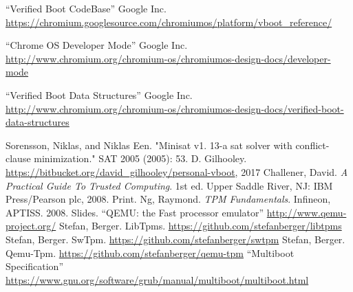 \documentclass[../report.tex]{subfiles}
\begin{document}
\begin{singlespace}
\begin{flushleft}
\begin{footnotesize}
\begin{thebibliography}{\kern\bibindent}
    ``Verified Boot CodeBase'' Google Inc. \url{https://chromium.googlesource.com/chromiumos/platform/vboot_reference/}

    ``Chrome OS Developer Mode'' Google Inc. \url{http://www.chromium.org/chromium-os/chromiumos-design-docs/developer-mode}

    ``Verified Boot Data Structures'' Google Inc. \url{http://www.chromium.org/chromium-os/chromiumos-design-docs/verified-boot-data-structures}

    Sorensson, Niklas, and Niklas Een. "Minisat v1. 13-a sat solver with conflict-clause minimization." SAT 2005 (2005): 53.
    D. Gilhooley. \url{https://bitbucket.org/david\_gilhooley/personal-vboot}, 2017
    Challener, David. \textit{A Practical Guide To Trusted Computing}. 1st ed. Upper Saddle River, NJ: IBM Press/Pearson plc, 2008. Print.
    Ng, Raymond. \textit{TPM Fundamentals}. Infineon, APTISS. 2008. Slides.
    ``QEMU: the Fast processor emulator'' \url{http://www.qemu-project.org/}
    Stefan, Berger. LibTpms. \url{https://github.com/stefanberger/libtpms}
    Stefan, Berger. SwTpm. \url{https://github.com/stefanberger/swtpm}
    Stefan, Berger. Qemu-Tpm. \url{https://github.com/stefanberger/qemu-tpm}
    ``Multiboot Specification'' \url{https://www.gnu.org/software/grub/manual/multiboot/multiboot.html}
\end{thebibliography}
\end{footnotesize}
\end{flushleft}
\end{singlespace}
\endgroup
\pagebreak
\end{document}
